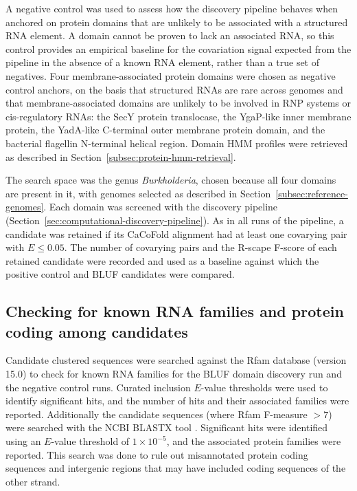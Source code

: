 A negative control was used to assess how the discovery pipeline behaves when anchored on protein domains that are unlikely to be associated with a structured RNA element.
A domain cannot be proven to lack an associated RNA, so this control provides an empirical baseline for the covariation signal expected from the pipeline in the absence of a known RNA element, rather than a true set of negatives.
Four membrane-associated protein domains were chosen as negative control anchors, on the basis that structured RNAs are rare across genomes and that membrane-associated domains are unlikely to be involved in \ac{RNP} systems or cis-regulatory RNAs: the SecY protein translocase, the YgaP-like inner membrane protein, the YadA-like C-terminal outer membrane protein domain, and the bacterial flagellin N-terminal helical region.
Domain \ac{HMM} profiles were retrieved as described in Section~\ref{subsec:protein-hmm-retrieval}.

The search space was the genus \emph{Burkholderia}, chosen because all four domains are present in it, with genomes selected as described in Section~\ref{subsec:reference-genomes}.
Each domain was screened with the discovery pipeline (Section~\ref{sec:computational-discovery-pipeline}).
As in all runs of the pipeline, a candidate was retained if its CaCoFold alignment had at least one covarying pair with $E \le 0.05$.
The number of covarying pairs and the R-scape F-score of each retained candidate were recorded and used as a baseline against which the positive control and \ac{BLUF} candidates were compared.

\subsection{Checking for known RNA families and protein coding among candidates}

Candidate clustered sequences were searched against the Rfam database (version 15.0) \citep{Ontiveros-Palacios2025} to check for known RNA families for the \ac{BLUF} domain discovery run and the negative control runs.
Curated inclusion $E$-value thresholds were used to identify significant hits, and the number of hits and their associated families were reported.
Additionally the candidate sequences (where Rfam F-measure $> 7$) were searched with the \ac{NCBI} BLASTX tool \citep{Altschul1997}.
Significant hits were identified using an $E$-value threshold of $1\times 10^{-5}$, and the associated protein families were reported.
This search was done to rule out misannotated protein coding sequences and intergenic regions that may have included coding sequences of the other strand.

